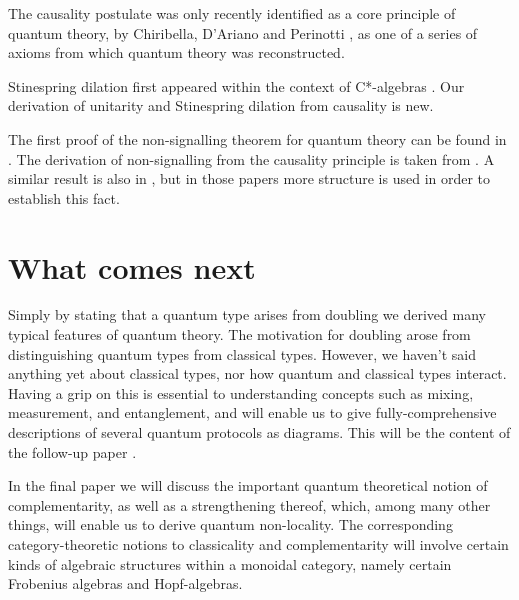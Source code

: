 \documentclass[10pt]{article}
\begin{document}
The causality postulate was only recently identified as a core principle of quantum theory, by Chiribella, D'Ariano and Perinotti \cite{chiri1}, as one of a series of axioms from which quantum theory was reconstructed.

Stinespring dilation first appeared within the context of C*-algebras \cite{Stinespring}. Our derivation of unitarity and Stinespring dilation from causality is new.  

The first proof of the non-signalling theorem for quantum theory can be found in \cite{Ghirardi}. The derivation of non-signalling from the causality principle  is taken from \cite{Cnonsig}. A similar result is also in \cite{FritzII}, but in those papers more structure is used in order to establish this fact.     

\section{What comes next}    

Simply by stating that a quantum type arises from doubling we derived many typical features of quantum theory.  The motivation for doubling arose from distinguishing quantum types from classical types.  However, we haven't said anything yet about classical types, nor how quantum and classical types interact. Having a grip on this is essential to understanding concepts such as mixing, measurement, and entanglement, and will enable us to give fully-comprehensive descriptions of several quantum protocols as diagrams.  This will be the content of the follow-up paper \cite{CQMII}.   

In the final paper \cite{CQMIII} we will discuss the important quantum theoretical notion of complementarity, as well as a strengthening thereof, which, among many other things, will enable us to derive quantum non-locality.  The corresponding category-theoretic  notions to classicality and complementarity  will involve certain  kinds of algebraic structures within a monoidal category, namely certain Frobenius algebras and Hopf-algebras.    


  
\end{document}
